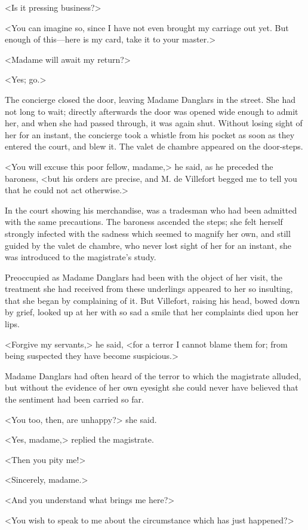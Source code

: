  <Is it pressing business?> 

 <You can imagine so, since I have not even brought my carriage out yet. But enough of this—here is my card, take it to your master.> 

 <Madame will await my return?> 

 <Yes; go.> 

 The concierge closed the door, leaving Madame Danglars in the street. She had not long to wait; directly afterwards the door was opened wide enough to admit her, and when she had passed through, it was again shut. Without losing sight of her for an instant, the concierge took a whistle from his pocket as soon as they entered the court, and blew it. The valet de chambre appeared on the door-steps. 

 <You will excuse this poor fellow, madame,> he said, as he preceded the baroness, <but his orders are precise, and M. de Villefort begged me to tell you that he could not act otherwise.> 

 In the court showing his merchandise, was a tradesman who had been admitted with the same precautions. The baroness ascended the steps; she felt herself strongly infected with the sadness which seemed to magnify her own, and still guided by the valet de chambre, who never lost sight of her for an instant, she was introduced to the magistrate's study. 

 Preoccupied as Madame Danglars had been with the object of her visit, the treatment she had received from these underlings appeared to her so insulting, that she began by complaining of it. But Villefort, raising his head, bowed down by grief, looked up at her with so sad a smile that her complaints died upon her lips. 

 <Forgive my servants,> he said, <for a terror I cannot blame them for; from being suspected they have become suspicious.> 

 Madame Danglars had often heard of the terror to which the magistrate alluded, but without the evidence of her own eyesight she could never have believed that the sentiment had been carried so far. 

 <You too, then, are unhappy?> she said. 

 <Yes, madame,> replied the magistrate. 

 <Then you pity me!> 

 <Sincerely, madame.> 

 <And you understand what brings me here?> 

 <You wish to speak to me about the circumstance which has just happened?> 

